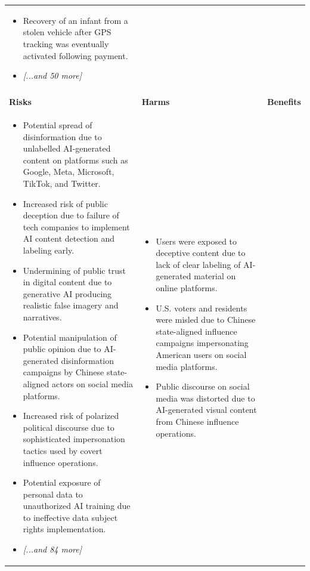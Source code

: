\begin{longtable}{p{5.2cm}|p{5.2cm}|p{5.2cm}}
\begin{itemize}[leftmargin=*, nosep, before=\vspace{-0.5\baselineskip}, after=\vspace{-0.5\baselineskip}]
\item Recovery of an infant from a stolen vehicle after GPS tracking was eventually activated following payment.
\item \textit{[...and 50 more]}
\end{itemize} \\
\pagebreak
\multicolumn{3}{l}{\textbf{\large Social Media} \textit{(N=52 articles)}} \\
\midrule
\textbf{Risks} & \textbf{Harms} & \textbf{Benefits} \\
\midrule
\begin{itemize}[leftmargin=*, nosep, before=\vspace{-0.5\baselineskip}, after=\vspace{-0.5\baselineskip}] 
\footnotesize
\item Potential spread of disinformation due to unlabelled AI-generated content on platforms such as Google, Meta, Microsoft, TikTok, and Twitter.
\item Increased risk of public deception due to failure of tech companies to implement AI content detection and labeling early.
\item Undermining of public trust in digital content due to generative AI producing realistic false imagery and narratives.
\item Potential manipulation of public opinion due to AI-generated disinformation campaigns by Chinese state-aligned actors on social media platforms.
\item Increased risk of polarized political discourse due to sophisticated impersonation tactics used by covert influence operations.
\item Potential exposure of personal data to unauthorized AI training due to ineffective data subject rights implementation.
\item \textit{[...and 84 more]}
\end{itemize} & \begin{itemize}[leftmargin=*, nosep, before=\vspace{-0.5\baselineskip}, after=\vspace{-0.5\baselineskip}] 
\footnotesize
\item Users were exposed to deceptive content due to lack of clear labeling of AI-generated material on online platforms.
\item U.S. voters and residents were misled due to Chinese state-aligned influence campaigns impersonating American users on social media platforms.
\item Public discourse on social media was distorted due to AI-generated visual content from Chinese influence operations.

\end{itemize}
\end{longtable}
